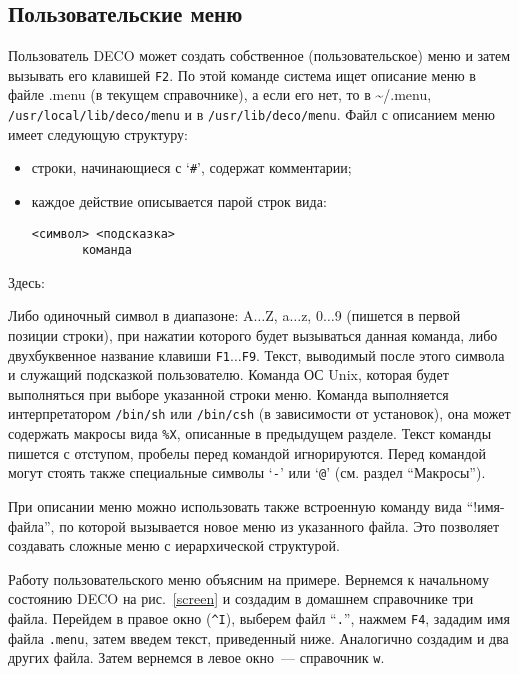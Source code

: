 \subsection{Пользовательские меню}

Пользователь DECO может создать собственное (пользовательское)
меню и затем вызывать его клавишей {\tt F2}. По этой команде
система ищет описание меню в файле .menu (в текущем справочнике),
а если его нет, то в \~{}/.menu, {\tt /usr/local/lib/deco/menu} и
в {\tt /usr/lib/deco/menu}.
Файл с описанием меню имеет следующую структуру:
\begin{itemize}
\item
строки, начинающиеся с `{\tt \#}', содержат комментарии;
\item
каждое действие описывается парой строк вида:
\begin{source}
\begin{verbatim}
<символ> <подсказка>
       команда
\end{verbatim}
\end{source}
\end{itemize}
Здесь:
\begin{example}
Либо одиночный символ в диапазоне: A$\ldots$Z, a$\ldots$z, 0$\ldots$9
(пишется в первой позиции строки), при нажатии которого будет вызываться
данная команда, либо двухбуквенное название клавиши {\tt F1}$\ldots${\tt F9}.
Текст, выводимый после этого символа и служащий подсказкой пользователю.
Команда ОС Unix, которая будет выполняться при
выборе указанной строки меню. Команда выполняется интерпретатором
{\tt /bin/sh} или {\tt /bin/csh} (в зависимости от установок),
она может содержать макросы вида {\tt \%X}, описанные в
предыдущем разделе.
Текст команды пишется с отступом, пробелы перед
командой игнорируются. Перед командой могут стоять также
специальные символы `{\tt -}' или `{\tt @}' (см. раздел ``Макросы'').
\end{example}

При описании меню можно использовать также встроенную команду
вида ``!имя-файла'', по которой вызывается новое меню из указанного файла.
Это позволяет создавать сложные меню с иерархической структурой.

Работу пользовательского меню объясним на примере. Вернемся к начальному
состоянию DECO на рис.~\ref{screen} и создадим в домашнем справочнике три
файла. Перейдем в правое окно ({\tt \^{}I}), выберем файл ``{\tt .}'',
нажмем {\tt F4}, зададим имя файла {\tt .menu}, затем введем текст,
приведенный ниже. Аналогично создадим и два других файла. Затем вернемся
в левое окно~--- справочник {\tt w}.

